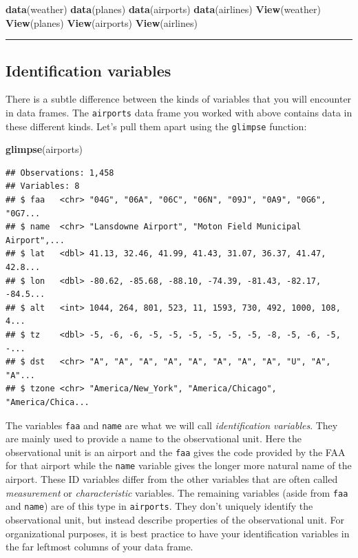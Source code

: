 \documentclass[]{tufte-book}
\newenvironment{Shaded}{\begin{snugshade}}{\end{snugshade}}
\newcommand{\KeywordTok}[1]{\textcolor[rgb]{0.13,0.29,0.53}{\textbf{{#1}}}}
\newcommand{\NormalTok}[1]{{#1}}
\let\oldrule=\rule
\renewcommand{\rule}[1]{\oldrule{\linewidth}}
\begin{document}
\begin{Shaded}
\begin{Highlighting}[]
\KeywordTok{data}\NormalTok{(weather)}
\KeywordTok{data}\NormalTok{(planes)}
\KeywordTok{data}\NormalTok{(airports)}
\KeywordTok{data}\NormalTok{(airlines)}
\KeywordTok{View}\NormalTok{(weather)}
\KeywordTok{View}\NormalTok{(planes)}
\KeywordTok{View}\NormalTok{(airports)}
\KeywordTok{View}\NormalTok{(airlines)}
\end{Highlighting}
\end{Shaded}

\begin{center}\rule{0.5\linewidth}{\linethickness}\end{center}

\subsection{Identification variables}\label{identification-variables}

There is a subtle difference between the kinds of variables that you
will encounter in data frames. The \texttt{airports} data frame you
worked with above contains data in these different kinds. Let's pull
them apart using the \texttt{glimpse} function:

\begin{Shaded}
\begin{Highlighting}[]
\KeywordTok{glimpse}\NormalTok{(airports)}
\end{Highlighting}
\end{Shaded}

\begin{verbatim}
## Observations: 1,458
## Variables: 8
## $ faa   <chr> "04G", "06A", "06C", "06N", "09J", "0A9", "0G6", "0G7...
## $ name  <chr> "Lansdowne Airport", "Moton Field Municipal Airport",...
## $ lat   <dbl> 41.13, 32.46, 41.99, 41.43, 31.07, 36.37, 41.47, 42.8...
## $ lon   <dbl> -80.62, -85.68, -88.10, -74.39, -81.43, -82.17, -84.5...
## $ alt   <int> 1044, 264, 801, 523, 11, 1593, 730, 492, 1000, 108, 4...
## $ tz    <dbl> -5, -6, -6, -5, -5, -5, -5, -5, -5, -8, -5, -6, -5, -...
## $ dst   <chr> "A", "A", "A", "A", "A", "A", "A", "A", "U", "A", "A"...
## $ tzone <chr> "America/New_York", "America/Chicago", "America/Chica...
\end{verbatim}

The variables \texttt{faa} and \texttt{name} are what we will call
\emph{identification variables}. They are mainly used to provide a name
to the observational unit. Here the observational unit is an airport and
the \texttt{faa} gives the code provided by the FAA for that airport
while the \texttt{name} variable gives the longer more natural name of
the airport. These ID variables differ from the other variables that are
often called \emph{measurement} or \emph{characteristic} variables. The
remaining variables (aside from \texttt{faa} and \texttt{name}) are of
this type in \texttt{airports}. They don't uniquely identify the
observational unit, but instead describe properties of the observational
unit. For organizational purposes, it is best practice to have your
identification variables in the far leftmost columns of your data frame.
\end{document}
